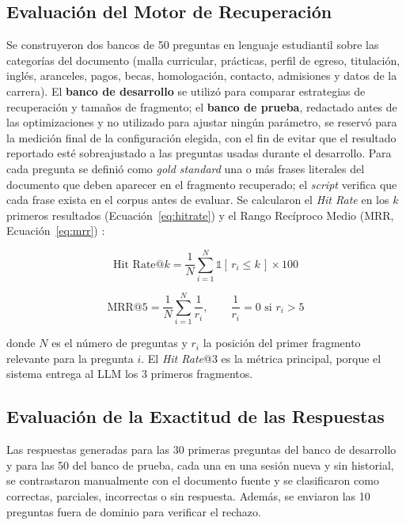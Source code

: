 \subsection{Evaluación del Motor de Recuperación}
Se construyeron dos bancos de 50 preguntas en lenguaje estudiantil sobre las categorías del documento (malla curricular, prácticas, perfil de egreso, titulación, inglés, aranceles, pagos, becas, homologación, contacto, admisiones y datos de la carrera). El \textbf{banco de desarrollo} se utilizó para comparar estrategias de recuperación y tamaños de fragmento; el \textbf{banco de prueba}, redactado antes de las optimizaciones y no utilizado para ajustar ningún parámetro, se reservó para la medición final de la configuración elegida, con el fin de evitar que el resultado reportado esté sobreajustado a las preguntas usadas durante el desarrollo. Para cada pregunta se definió como \textit{gold standard} una o más frases literales del documento que deben aparecer en el fragmento recuperado; el \textit{script} verifica que cada frase exista en el corpus antes de evaluar. Se calcularon el \textit{Hit Rate} en los $k$ primeros resultados (Ecuación~\ref{eq:hitrate}) y el Rango Recíproco Medio (MRR, Ecuación~\ref{eq:mrr}) \cite{voorhees1999trec}:

\begin{equation}
\label{eq:hitrate}
\text{Hit Rate@}k = \frac{1}{N} \sum_{i=1}^{N} \mathbb{1}\left[\, r_i \leq k \,\right] \times 100
\end{equation}

\begin{equation}
\label{eq:mrr}
\text{MRR@}5 = \frac{1}{N} \sum_{i=1}^{N} \frac{1}{r_i}, \qquad \frac{1}{r_i} = 0 \text{ si } r_i > 5
\end{equation}

donde $N$ es el número de preguntas y $r_i$ la posición del primer fragmento relevante para la pregunta $i$. El \textit{Hit Rate}@3 es la métrica principal, porque el sistema entrega al LLM los 3 primeros fragmentos.

\subsection{Evaluación de la Exactitud de las Respuestas}
Las respuestas generadas para las 30 primeras preguntas del banco de desarrollo y para las 50 del banco de prueba, cada una en una sesión nueva y sin historial, se contrastaron manualmente con el documento fuente y se clasificaron como correctas, parciales, incorrectas o sin respuesta. Además, se enviaron las 10 preguntas fuera de dominio para verificar el rechazo.

